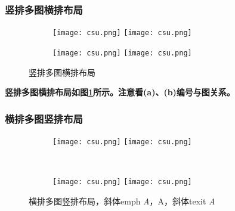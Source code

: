 \subsubsection{竖排多图横排布局}

\begin{figure}[!htb]
    \centering
    \begin{subfigure}[t]{0.13\linewidth}
    	\captionsetup{justification=centering} %
        \begin{minipage}[b]{1\linewidth}
        \texttt{[image: csu.png]} \vspace{-1ex} \vfill
        \texttt{[image: csu.png]}
         \caption{}
        \end{minipage}
    \end{subfigure}
    \begin{subfigure}[t]{0.13\linewidth}
    	\captionsetup{justification=centering} %
        \begin{minipage}[b]{1\linewidth}
        \texttt{[image: csu.png]} \vspace{-1ex} \vfill
        \texttt{[image: csu.png]}
        \caption{}
        \end{minipage}
    \end{subfigure}
    \caption{竖排多图横排布局}
    \label{F.csu_col_row}
\end{figure}

\textbf{竖排多图横排布局如图\ref{F.csu_col_row}所示。注意看(a)、(b)编号与图关系。}


\subsubsection{横排多图竖排布局}



\begin{figure}[!htb]
    \centering
    \begin{subfigure}[t]{0.3\linewidth}
    	\captionsetup{justification=centering} %
        \begin{minipage}[b]{1\linewidth}
        \texttt{[image: csu.png]}
        \texttt{[image: csu.png]}
        \caption{}
        \end{minipage}
    \end{subfigure}\\
    \begin{subfigure}[t]{0.3\linewidth}
    	\captionsetup{justification=centering} %
        \begin{minipage}[b]{1\linewidth}
        \texttt{[image: csu.png]}
        \texttt{[image: csu.png]}
        \caption{}
        \end{minipage}
    \end{subfigure}
    \caption{横排多图竖排布局，斜体emph \emph{A}，A，斜体texit \textit{A}}
    \label{F.csu_row_col}
\end{figure}

